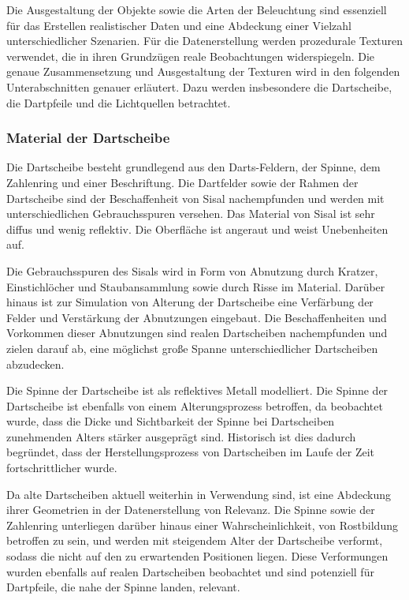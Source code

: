 Die Ausgestaltung der Objekte sowie die Arten der Beleuchtung sind essenziell für das Erstellen realistischer Daten und eine Abdeckung einer Vielzahl unterschiedlicher Szenarien. Für die Datenerstellung werden prozedurale Texturen verwendet, die in ihren Grundzügen reale Beobachtungen widerspiegeln. Die genaue Zusammensetzung und Ausgestaltung der Texturen wird in den folgenden Unterabschnitten genauer erläutert. Dazu werden insbesondere die Dartscheibe, die Dartpfeile und die Lichtquellen betrachtet.

\subsubsection{Material der Dartscheibe}

Die Dartscheibe besteht grundlegend aus den Darts-Feldern, der Spinne, dem Zahlenring und einer Beschriftung. Die Dartfelder sowie der Rahmen der Dartscheibe sind der Beschaffenheit von Sisal nachempfunden und werden mit unterschiedlichen Gebrauchsspuren versehen. Das Material von Sisal ist sehr diffus und wenig reflektiv. Die Oberfläche ist angeraut und weist Unebenheiten auf.

Die Gebrauchsspuren des Sisals wird in Form von Abnutzung durch Kratzer, Einstichlöcher und Staubansammlung sowie durch Risse im Material. Darüber hinaus ist zur Simulation von Alterung der Dartscheibe eine Verfärbung der Felder und Verstärkung der Abnutzungen eingebaut. Die Beschaffenheiten und Vorkommen dieser Abnutzungen sind realen Dartscheiben nachempfunden und zielen darauf ab, eine möglichst große Spanne unterschiedlicher Dartscheiben abzudecken.

Die Spinne der Dartscheibe ist als reflektives Metall modelliert. Die Spinne der Dartscheibe ist ebenfalls von einem Alterungsprozess betroffen, da beobachtet wurde, dass die Dicke und Sichtbarkeit der Spinne bei Dartscheiben zunehmenden Alters stärker ausgeprägt sind. Historisch ist dies dadurch begründet, dass der Herstellungsprozess von Dartscheiben im Laufe der Zeit fortschrittlicher wurde.

Da alte Dartscheiben aktuell weiterhin in Verwendung sind, ist eine Abdeckung ihrer Geometrien in der Datenerstellung von Relevanz. Die Spinne sowie der Zahlenring unterliegen darüber hinaus einer Wahrscheinlichkeit, von Rostbildung betroffen zu sein, und werden mit steigendem Alter der Dartscheibe verformt, sodass die nicht auf den zu erwartenden Positionen liegen. Diese Verformungen wurden ebenfalls auf realen Dartscheiben beobachtet und sind potenziell für Dartpfeile, die nahe der Spinne landen, relevant.

